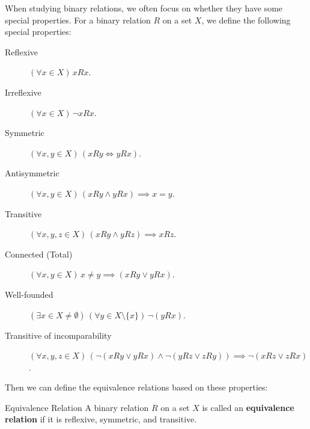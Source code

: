 When studying binary relations, we often focus on whether they have some special properties. 
For a binary relation \(R\) on a set \(X\), we define the following special properties:
\begin{description}
    \item[Reflexive] \((\forall  x \in X)\, xRx\).
    \item[Irreflexive] \((\forall x \in X)\, \neg xRx\).
    \item[Symmetric] \((\forall x, y \in X)\, (xRy \Leftrightarrow yRx)\).
    \item[Antisymmetric] \((\forall x, y \in X)\, (xRy \wedge yRx) \implies x = y\).
    \item[Transitive] \((\forall x, y, z \in X)\, (xRy \wedge yRz) \implies xRz\).
    \item[Connected (Total)] \((\forall x, y \in X)\, x\neq y \implies (xRy \vee yRx)\).
    \item[Well-founded] \((\exists x\in X \neq \emptyset)\,(\forall y \in X\setminus \{x\})\, \neg(yRx)\).
    \item[Transitive of incomparability] 
        \((\forall x, y, z \in X)\, (\neg(xRy \vee yRx) \wedge \neg(yRz \vee zRy)) \implies \neg(xRz \vee zRx)\).
\end{description}

Then we can define the equivalence relations based on these properties:
\begin{definition}{Equivalence Relation} %
    A binary relation \(R\) on a set \(X\) is called an \textbf{equivalence relation} 
    if it is reflexive, symmetric, and transitive.
\end{definition}


